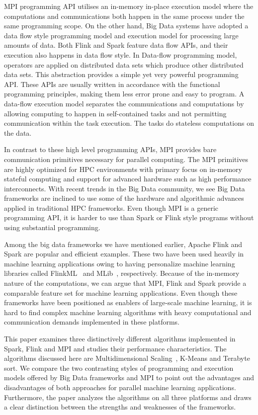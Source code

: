 \documentclass[conference]{IEEEtran}
\begin{document}
MPI programming API utilises an in-memory in-place execution model where the computations and communications both happen in the same process under the same programming scope. On the other hand, Big Data systems have adopted a data flow style programming model and execution model for processing large amounts of data. Both Flink and Spark feature data flow APIs, and their execution also happens in data flow style. In Data-flow programming model, operators are applied on distributed data sets which produce other distributed data sets. This abstraction provides a simple yet very powerful programming API. These APIs are usually written in accordance with the functional programming principles, making them less error prone and easy to program. A data-flow execution model separates the communications and computations by allowing computing to happen in self-contained tasks and not permitting communication within the task execution. The tasks do stateless computations on the data. 

In contrast to these high level programming APIs, MPI provides bare communication primitives necessary for parallel computing. The MPI primitives are highly optimized for HPC environments with primary focus on in-memory stateful computing and support for advanced hardware such as high performance interconnects. With recent trends in the Big Data community, we see Big Data frameworks are inclined to use some of the hardware and algorithmic advances applied in traditional HPC frameworks. Even though MPI is a generic programming API, it is harder to use than Spark or Flink style programs without using substantial programming. 

Among the big data frameworks we have mentioned earlier, Apache Flink and Spark are popular and efficient examples. These two have been used heavily in machine learning applications owing to having personalize machine learning libraries called FlinkML~\cite{carbone2015lightweight} and MLib~\cite{meng2016mllib}, respectively. Because of the in-memory nature of the computations, we can argue that MPI, Flink and Spark provide a comparable feature set for machine learning applications. Even though these frameworks have been positioned as enablers of large-scale machine learning, it is hard to find complex machine learning algorithms with heavy computational and communication demands implemented in these platforms. 

This paper examines three distinctively different algorithms implemented in Spark, Flink and MPI and studies their performance characteristics. The algorithms discussed here are Multidimensional Scaling~\cite{kruskal1964multidimensional}, K-Means and Terabyte sort. We compare the two contrasting styles of programming and execution models offered by Big Data frameworks and MPI to point out the advantages and disadvantages of both approaches for parallel machine learning applications. Furthermore, the paper analyzes the algorithms on all three platforms and draws a clear distinction between the strengths and weaknesses of the frameworks.
\end{document}
